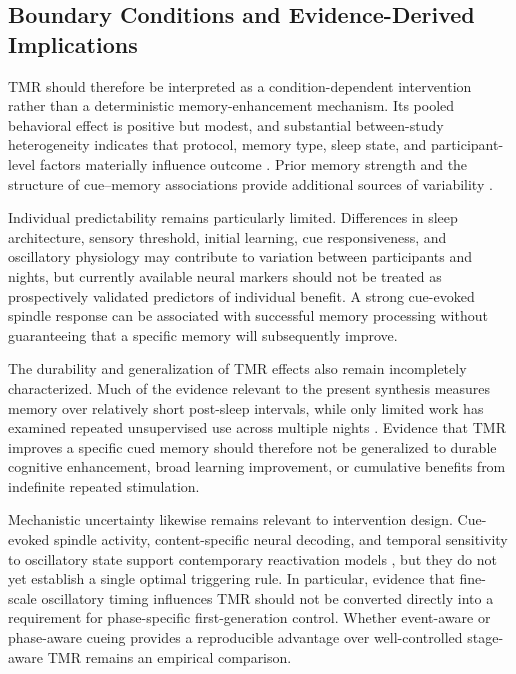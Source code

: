 \subsection{Boundary Conditions and Evidence-Derived Implications}

TMR should therefore be interpreted as a condition-dependent intervention rather
than a deterministic memory-enhancement mechanism. Its pooled behavioral effect
is positive but modest, and substantial between-study heterogeneity indicates
that protocol, memory type, sleep state, and participant-level factors materially
influence outcome \citep{hu2020promoting}. Prior memory strength and the
structure of cue--memory associations provide additional sources of variability
\citep{creery2015priorlearning,cairney2016benefits}.

Individual predictability remains particularly limited. Differences in sleep
architecture, sensory threshold, initial learning, cue responsiveness, and
oscillatory physiology may contribute to variation between participants and
nights, but currently available neural markers should not be treated as
prospectively validated predictors of individual benefit. A strong cue-evoked
spindle response can be associated with successful memory processing without
guaranteeing that a specific memory will subsequently improve.

The durability and generalization of TMR effects also remain incompletely
characterized. Much of the evidence relevant to the present synthesis measures
memory over relatively short post-sleep intervals, while only limited work has
examined repeated unsupervised use across multiple nights
\citep{goldi2019home,whitmore2022improving}. Evidence that TMR improves a
specific cued memory should therefore not be generalized to durable cognitive
enhancement, broad learning improvement, or cumulative benefits from indefinite
repeated stimulation.

Mechanistic uncertainty likewise remains relevant to intervention design.
Cue-evoked spindle activity, content-specific neural decoding, and temporal
sensitivity to oscillatory state support contemporary reactivation models
\citep{cairney2018spindle,wang2019signals,antony2018spindle}, but they do not
yet establish a single optimal triggering rule. In particular, evidence that
fine-scale oscillatory timing influences TMR should not be converted directly
into a requirement for phase-specific first-generation control. Whether
event-aware or phase-aware cueing provides a reproducible advantage over
well-controlled stage-aware TMR remains an empirical comparison.

